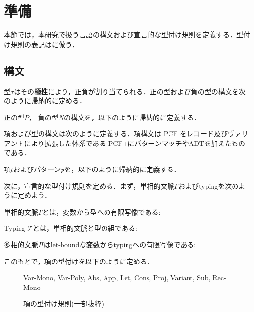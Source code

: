 \section{準備}
本節では，本研究で扱う言語の構文および宣言的な型付け規則を定義する．型付け規則の表記は\cite{DBLP:conf/popl/DolanM17}に倣う．
\subsection{構文}
型$\tau$はその\textbf{極性}により，正負が割り当てられる．正の型および負の型の構文を次のように帰納的に定める．
\begin{definition} [型の構文]
正の型$P$， 負の型$N$の構文を，以下のように帰納的に定義する．
\end{definition}
項および型の構文は次のように定義する．項構文は PCF をレコード及びヴァリアントにより拡張した体系である PCF+\cite{gunter92}にパターンマッチやADTを加えたものである．
\label{subsec:syntax}
\begin{definition}[項の構文]
項$t$およびパターン$p$を，以下のように帰納的に定義する．
\end{definition}

次に，宣言的な型付け規則を定める．まず，単相的文脈$\Gamma$およびtypingを次のように定めよう．
\begin{definition}[単相的文脈]
単相的文脈$\Gamma$とは，変数から型への有限写像である:
\end{definition}
\begin{definition}[Typing]
Typing $\mathcal{T}$とは，単相的文脈と型の組である:
\end{definition}
\begin{definition}[多相的文脈]
多相的文脈$\Pi$はlet-boundな変数からtypingへの有限写像である:
\end{definition}
このもとで，項の型付けを以下のように定める．
\begin{figure}[H]
 {} {Var-Mono, Var-Poly, Abs, App, Let, Cons, Proj, Variant, Sub, Rec-Mono}
\caption{項の型付け規則(一部抜粋)}
\end{figure}